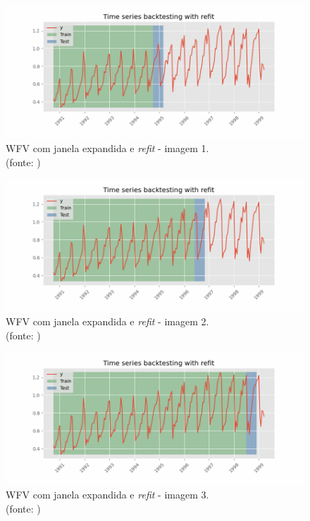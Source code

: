 \begin{figure}[!h]
	\centering
	\includegraphics[scale=0.3]{Figuras/imagem1_skforecast-backtesting-refit.png}
	\caption{WFV com janela expandida e \textit{refit} - imagem 1.\\(fonte: \cite{skforecast})}
	\label{fig:imagem1_skforecast-backtesting-refit}
\end{figure}

\begin{figure}[!h]
	\centering
	\includegraphics[scale=0.3]{Figuras/imagem2_skforecast-backtesting-refit.png}
	\caption{WFV com janela expandida e \textit{refit} - imagem 2.\\(fonte: \cite{skforecast})}
	\label{fig:imagem2_skforecast-backtesting-refit}
\end{figure}

\begin{figure}[!h]
	\centering
	\includegraphics[scale=0.3]{Figuras/imagem3_skforecast-backtesting-refit.png}
	\caption{WFV com janela expandida e \textit{refit} - imagem 3.\\(fonte: \cite{skforecast})}
	\label{fig:imagem3_skforecast-backtesting-refit}
\end{figure}

